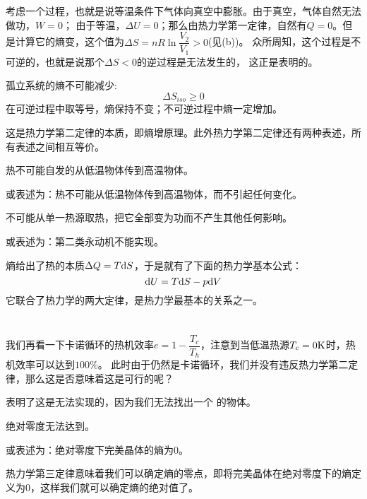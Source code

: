             考虑一个过程，也就是说等温条件下气体向真空中膨胀。由于真空，气体自然无法做功，$W=0$；
            由于等温，$\Delta U=0$；那么由热力学第一定律，自然有$Q=0$。但是计算它的熵变，这个值为$\Delta S = nR\ln\dfrac{V_2}{V_1}>0$(见(b))。
            众所周知，这个过程是不可逆的，也就是说那个$\Delta S<0$的逆过程是无法发生的，
            这正是表明的。
            \begin{law}
                孤立系统的熵不可能减少:
                \begin{equation}
                    \Delta S_{iso} \geq 0
                    \nonumber
                \end{equation}
                在可逆过程中取等号，熵保持不变；不可逆过程中熵一定增加。
            \end{law}
            这是热力学第二定律的本质，即熵增原理。此外热力学第二定律还有两种表述，所有表述之间相互等价。
            \begin{law}
                热不可能自发的从低温物体传到高温物体。

                或表述为：热不可能从低温物体传到高温物体，而不引起任何变化。
            \end{law}
            \begin{law}
                不可能从单一热源取热，把它全部变为功而不产生其他任何影响。

                或表述为：第二类永动机不能实现。
            \end{law}
            熵给出了热的本质$\Delta{Q} = T\mathrm{d}{S}$，于是就有了下面的热力学基本公式：
            \begin{equation}
                \mathrm{d}{U} = T\mathrm{d}{S}-p\mathrm{d}{V}
                \nonumber
            \end{equation}
            它联合了热力学的两大定律，是热力学最基本的关系之一。
    \section[热力学第三定律]{}
        我们再看一下卡诺循环的热机效率$e = 1-\dfrac{T_c}{T_h}$，注意到当低温热源$T_c = 0 \rm{K}$时，热机效率可以达到$100\%$。
        此时由于仍然是卡诺循环，我们并没有违反热力学第二定律，那么这是否意味着这是可行的呢？

        表明了这是无法实现的，因为我们无法找出一个\linebreak{}
        的物体。
        \begin{law}
            绝对零度无法达到。

            或表述为：绝对零度下完美晶体的熵为$0$。
        \end{law}
        热力学第三定律意味着我们可以确定熵的零点，即将完美晶体在绝对零度下的熵定义为$0$，这样我们就可以确定熵的绝对值了。
